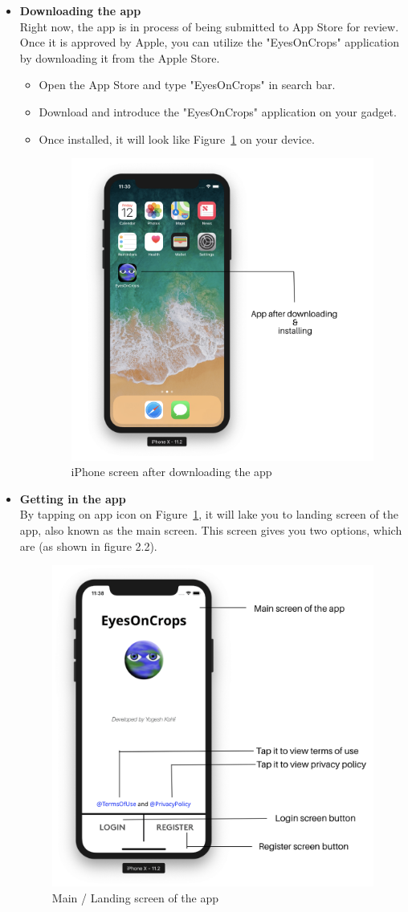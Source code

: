 \begin{itemize}
    \item \textbf{Downloading the app} \\
    Right now, the app is in process of being submitted to App Store for review. Once it is approved by Apple, you can utilize the "EyesOnCrops" application by downloading it from the Apple Store. 
    
    \begin{itemize}
        \item Open the App Store and type "EyesOnCrops" in search bar.
        \item Download and introduce the "EyesOnCrops" application on your gadget.
        \item Once installed, it will look like Figure~\ref{fig:app_icon_screen} on your device.
        
        \begin{figure}[H]
            \centering
            \includegraphics[width=0.50\linewidth]{figures/ch2/app_icon_screen.png}
            \caption{\label{fig:app_icon_screen} iPhone screen after downloading the app}
        \end{figure}
    \end{itemize}
    
    \item \textbf{Getting in the app} \\
    By tapping on app icon on Figure~\ref{fig:app_icon_screen}, it will lake you to landing screen of the app, also known as the main screen. This screen gives you two options, which are (as shown in figure 2.2).
     
        \begin{figure}[H]
            \centering
            \includegraphics[width=0.50\linewidth]{figures/ch2/main_screen.png}
            \caption{\label{fig:main_screen} Main / Landing screen of the app}
        \end{figure}


\end{itemize}
